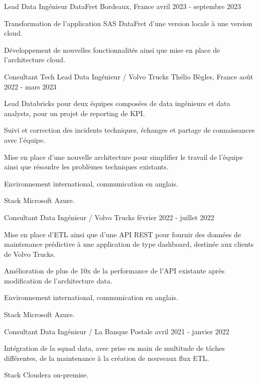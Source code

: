 
\begin{cventries}
	\cventry
	{Lead Data Ingénieur}
	{DataFret}
	{Bordeaux, France}
	{avril 2023 - septembre 2023}
	{
		\begin{cvitems}
			\item {Transformation de l'application SAS DataFret d'une version locale à une version cloud.}
			\item {Développement de nouvelles fonctionnalités ainsi que mise en place de l'architecture cloud.}
		\end{cvitems}
	}
	
	\cventry
	{Consultant Tech Lead Data Ingénieur / Volvo Trucks}
	{Thélio}
	{Bègles, France}
	{août 2022 - mars 2023}
	{
		\begin{cvitems}
			\item Lead Databricks pour deux équipes composées de data ingénieurs et data analysts, pour un projet de reporting de KPI.
			\item Suivi et correction des incidents techniques, échanges et partage de connaissances avec l'équipe.
			\item Mise en place d'une nouvelle architecture pour simplifier le travail de l'équipe ainsi que résoudre les problèmes techniques existants.
			\item Environnement international, communication en anglais.
			\item Stack Microsoft Azure.
		\end{cvitems}
	}
	
	\cventry
	{Consultant Data Ingénieur / Volvo Trucks}{}{}
	{février 2022 - juillet 2022}
	{
		\begin{cvitems}
			\item Mise en place d'ETL ainsi que d'une API REST pour fournir des données de maintenance prédictive à une application de type dashboard, destinée aux clients de Volvo Trucks.
			\item Amélioration de plus de 10x de la performance de l'API existante après modification de l'architecture data.
			\item Environnement international, communication en anglais.
			\item Stack Microsoft Azure.
		\end{cvitems}
	}
	
	\cventry
	{Consultant Data Ingénieur / La Banque Postale}{}{}
	{avril 2021 - janvier 2022}
	{
		\begin{cvitems}
			\item Intégration de la squad data, avec prise en main de multitude de tâches différentes, de la maintenance à la création de nouveaux flux ETL.
			\item Stack Cloudera on-premise.
		\end{cvitems}
	}
	

\end{cventries}
